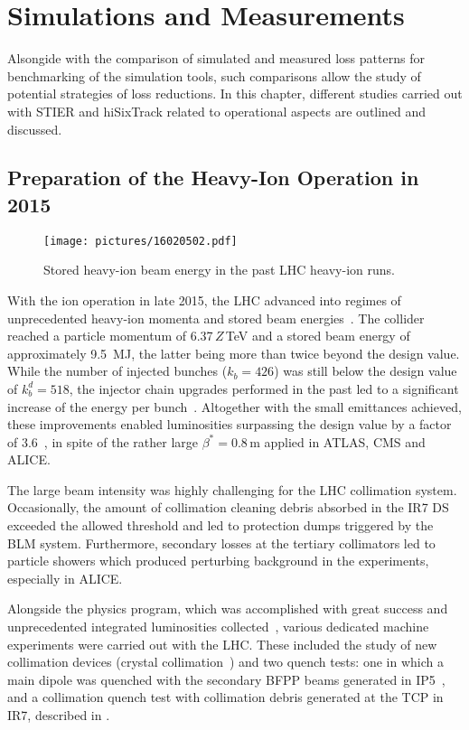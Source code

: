 \chapter{Simulations and Measurements} \label{chap:sim_meas}

Alsongide with the comparison of simulated and measured loss patterns for benchmarking of the simulation tools, such comparisons allow the study of potential strategies of loss reductions. In this chapter, different studies carried out with STIER and hiSixTrack related to operational aspects are outlined and discussed.

\section{Preparation of the Heavy-Ion Operation in 2015} \label{chap:prep2015}

\begin{figure}[b]  
    \centering
    \texttt{[image: pictures/16020502.pdf]}
    \caption{Stored heavy-ion beam energy in the past LHC heavy-ion runs.}  
    \label{pic:16020502}
\end{figure}

With the \lead ion operation in late 2015, the LHC advanced into regimes of unprecedented heavy-ion momenta and stored beam energies~\cite{IPAC16:TUPMW027}. The collider reached a particle momentum of 6.37$\,Z\,$TeV and a stored beam energy of approximately 9.5~MJ, the latter being more than twice beyond the design value. While the number of injected bunches ($k_b=426$) was still below the design value of $k_b^{d} = 518$, the injector chain upgrades performed in the past led to a significant increase of the energy per bunch~\cite{}. Altogether with the small emittances achieved, these improvements enabled luminosities surpassing the design value by a factor of 3.6~\cite{IPAC16:TUPMW027}, in spite of the rather large $\beta^*=0.8\,$m applied in ATLAS, CMS and ALICE.

The large beam intensity was highly challenging for the LHC collimation system. Occasionally, the amount of collimation cleaning debris absorbed in the IR7 DS exceeded the allowed threshold and led to protection dumps triggered by the BLM system. Furthermore, secondary losses at the tertiary collimators led to particle showers which produced perturbing background in the experiments, especially in ALICE. 

Alongside the physics program, which was accomplished with great success and unprecedented integrated luminosities collected~\cite{IPAC16:TUPMW027}, various dedicated machine experiments were carried out with the LHC. These included the study of new collimation devices (crystal collimation~\cite{mirarchiphd}) and two quench tests: one in which a main dipole was quenched with the secondary BFPP beams generated in IP5~\cite{accnote_bfpp_quench}, and a collimation quench test with collimation debris generated at the TCP in IR7, described in \chapref{}.

